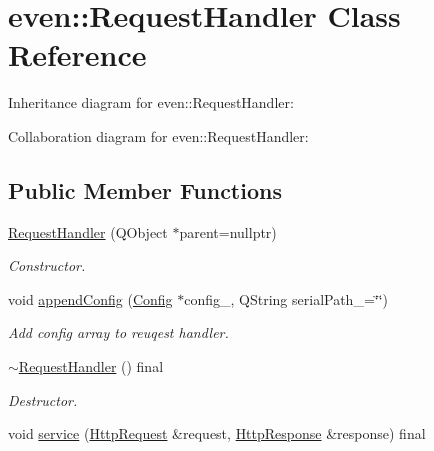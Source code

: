 \hypertarget{classeven_1_1_request_handler}{}\section{even\+:\+:Request\+Handler Class Reference}
\label{classeven_1_1_request_handler}


Inheritance diagram for even\+:\+:Request\+Handler\+:


Collaboration diagram for even\+:\+:Request\+Handler\+:
\subsection*{Public Member Functions}
\begin{DoxyCompactItemize}
\item 
\mbox{\hyperlink{classeven_1_1_request_handler_a8faff127035756234c50d76f137591eb}{Request\+Handler}} (Q\+Object $\ast$parent=nullptr)
\begin{DoxyCompactList}\small\item\em Constructor. \end{DoxyCompactList}\item 
\mbox{\label{classeven_1_1_request_handler_a47fa831e85f6df6f494ae20bd058e562}} 
void \mbox{\hyperlink{classeven_1_1_request_handler_a47fa831e85f6df6f494ae20bd058e562}{append\+Config}} (\mbox{\hyperlink{classeven_1_1_config}{Config}} $\ast$config\+\_\+, Q\+String serial\+Path\+\_\+=\char`\"{}\char`\"{})
\begin{DoxyCompactList}\small\item\em Add config array to reuqest handler. \end{DoxyCompactList}\item 
\mbox{\label{classeven_1_1_request_handler_a9276b7c64f149e3eb3ca6928ca463ebb}} 
\mbox{\hyperlink{classeven_1_1_request_handler_a9276b7c64f149e3eb3ca6928ca463ebb}{$\sim$\+Request\+Handler}} () final
\begin{DoxyCompactList}\small\item\em Destructor. \end{DoxyCompactList}\item 
void \mbox{\hyperlink{classeven_1_1_request_handler_ad7b53aca14b37e95101c3e80ddccad33}{service}} (\mbox{\hyperlink{classstefanfrings_1_1_http_request}{Http\+Request}} \&request, \mbox{\hyperlink{classstefanfrings_1_1_http_response}{Http\+Response}} \&response) final

\end{DoxyCompactItemize}
